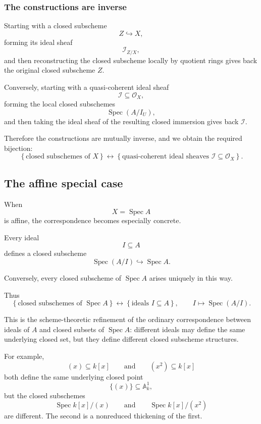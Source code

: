 \documentclass[12pt,a4paper]{article}
\DeclareMathOperator{\Spec}{Spec}
\newcommand{\OO}{\mathcal{O}}
\providecommand{\Spec}{\operatorname{Spec}}
\providecommand{\A}{\mathbb A}
\theoremstyle{notespace}
\begin{document}
\subsubsection{The constructions are inverse}

Starting with a closed subscheme
\[
Z\hookrightarrow X,
\]
forming its ideal sheaf
\[
\mathcal{I}_{Z/X},
\]
and then reconstructing the closed subscheme locally by quotient rings gives back the original closed subscheme \(Z\).

Conversely, starting with a quasi-coherent ideal sheaf
\[
\mathcal{I}\subseteq \OO_X,
\]
forming the local closed subschemes
\[
\Spec(A/I_U),
\]
and then taking the ideal sheaf of the resulting closed immersion gives back \(\mathcal{I}\).

Therefore the constructions are mutually inverse, and we obtain the required bijection:
\[
\boxed{
	\left\{
	\text{closed subschemes of }X
	\right\}
	\longleftrightarrow
	\left\{
	\text{quasi-coherent ideal sheaves }
	\mathcal{I}\subseteq \OO_X
	\right\}.
}
\]

\subsection{The affine special case}

When
\[
X=\Spec A
\]
is affine, the correspondence becomes especially concrete.

Every ideal
\[
I\subseteq A
\]
defines a closed subscheme
\[
\Spec(A/I)\hookrightarrow \Spec A.
\]

Conversely, every closed subscheme of \(\Spec A\) arises uniquely in this way.

Thus
\[
\boxed{
	\left\{
	\text{closed subschemes of }\Spec A
	\right\}
	\longleftrightarrow
	\left\{
	\text{ideals }I\subseteq A
	\right\},
	\qquad
	I\longmapsto \Spec(A/I).
}
\]

This is the scheme-theoretic refinement of the ordinary correspondence between ideals of \(A\) and closed subsets of \(\Spec A\): different ideals may define the same underlying closed set, but they define different closed subscheme structures.

For example,
\[
(x)\subseteq k[x]
\qquad\text{and}\qquad
(x^2)\subseteq k[x]
\]
both define the same underlying closed point
\[
\{(x)\}\subseteq \A^1_k,
\]
but the closed subschemes
\[
\Spec k[x]/(x)
\qquad\text{and}\qquad
\Spec k[x]/(x^2)
\]
are different. The second is a nonreduced thickening of the first.

\end{document}
